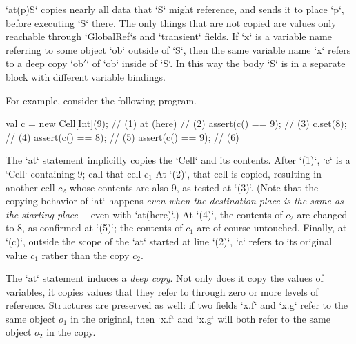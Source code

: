 \xcd`at(p)S` copies nearly all data that \xcd`S` might reference, and sends it
to place \xcd`p`, before executing \xcd`S` there. The only things that are not
copied are values only reachable through \xcd`GlobalRef`s and \xcd`transient`
fields.    If \xcd`x` is a
variable name referring to some object \xcd`ob` outside of \xcd`S`, then the
same variable name \xcd`x` refers to a deep copy \xcd`ob{$'$}` of \xcd`ob`
inside of \xcd`S`.  In this way the body \xcd`S` is in a separate block with
different variable bindings.

For example, consider the following program.
\begin{xten}
val c = new Cell[Int](9); // (1)
at (here) {               // (2)
   assert(c() == 9);      // (3)
   c.set(8);              // (4)
   assert(c() == 8);      // (5)
}
assert(c() == 9);         // (6)
\end{xten}
The \xcd`at` statement implicitly copies the \xcd`Cell` and its contents.  
After \xcd`(1)`, \xcd`c` is a \xcd`Cell` containing 9; call that cell {$c_1$}
At \xcd`(2)`, that cell is copied, resulting in another cell {$c_2$} whose
contents are also 9, as tested at \xcd`(3)`.
(Note that the copying behavior of \xcd`at` happens {\em even when the
destination place is the same as the starting place}--- even with
\xcd`at(here)`.)
At \xcd`(4)`, the contents of {$c_2$} are changed to 8, as confirmed at \xcd`(5)`; the contents of
{$c_1$} are of course untouched.    Finally, at \xcd`(c)`, outside the scope
of the \xcd`at` started at line \xcd`(2)`, \xcd`c` refers to its original
value {$c_1$} rather than the copy {$c_2$}.  

The \xcd`at` statement induces a {\em deep copy}.  Not only does it copy the
values of variables, it copies values that they refer to through zero or more
levels of reference.  Structures are preserved as well: if two fields
\xcd`x.f` and \xcd`x.g` refer to the same object {$o_1$} in the original, then
\xcd`x.f` and \xcd`x.g` will both refer to the same object {$o_2$} in the
copy.  

